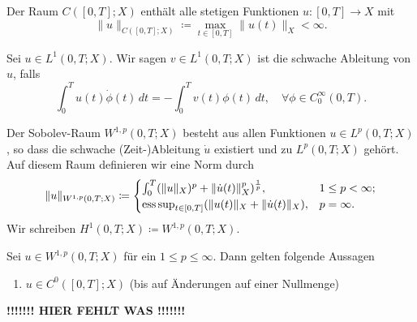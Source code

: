 \documentclass[../skript.tex]{subfiles}
\begin{document}
\begin{definition}\label{def:c4e2s2}
	Der Raum $C([0,T];X)$ enthält alle stetigen Funktionen $u:[0,T]\to X$ mit 
	\[
		\|u\|_{C([0,T];X)} \coloneqq \max_{t\in[0,T]} \|u(t)\|_X < \infty.
	\]
\end{definition}

\begin{definition}\label{def:c4e2s3}
	Sei $u\in L^1(0,T;X)$. Wir sagen $v\in L^1(0,T;X)$ ist die schwache Ableitung von $u$, falls
	\[
		\int_0^T u(t)\dot{\phi}(t)\,dt = - \int_0^T v(t)\phi(t)\,dt,\quad\forall\phi\in C^\infty_0(0,T).
	\]
\end{definition}

\begin{definition}\label{def:c4e2s4}
	Der Sobolev-Raum $W^{1,p}(0,T;X)$ besteht aus allen Funktionen $u\in L^p(0,T;X)$, so dass die schwache (Zeit-)Ableitung $\dot{u}$ existiert und zu $L^p(0,T;X)$ gehört. Auf diesem Raum definieren wir eine Norm durch
	\[
		\|u\|_{W^{1,p}(0,T;X)} \coloneqq 
			\begin{cases}
				\int_0^T (\|u\|_X)^p + \|\dot{u}(t)\|_X^p)^{\frac{1}{p}},&1\leq p<\infty;\\
				\operatorname*{ess\,sup}_{t\in[0,T]} (\|u(t)\|_X + \|\dot{u}(t)\|_X),&p=\infty.
			\end{cases}
	\]
	Wir schreiben $H^1(0,T;X)\coloneqq W^{1,p}(0,T;X)$. 
\end{definition}

\begin{theorem}\label{thm:c2e4s5}
	Sei $u\in W^{1,p}(0,T;X)$ für ein $1\leq p\leq\infty$. Dann gelten folgende Aussagen
	\begin{enumerate}
		\item $u\in C^0([0,T];X)$ (bis auf Änderungen auf einer Nullmenge)
	\end{enumerate}
	\textbf{!!!!!!! HIER FEHLT WAS !!!!!!!}
\end{theorem}
\end{document}

